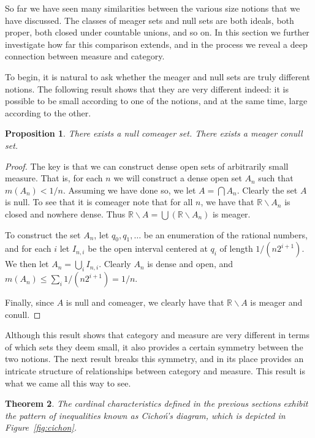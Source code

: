 \documentclass[11pt,oneside,a4paper]{amsbook}
\newcommand{\R}{\mathbb R}
\theoremstyle{definition}
\theoremstyle{plain}
\newtheorem{theorem}{Theorem}[section]
\newtheorem{proposition}[theorem]{Proposition}
\theoremstyle{definition}
\theoremstyle{remark}
\numberwithin{equation}{section}
\numberwithin{figure}{section}
\begin{document}
So far we have seen many similarities between the various size notions that we have discussed. The classes of meager sets and null sets are both ideals, both proper, both closed under countable unions, and so on. In this section we further investigate how far this comparison extends, and in the process we reveal a deep connection between measure and category.

To begin, it is natural to ask whether the meager and null sets are truly different notions. The following result shows that they are very different indeed: it is possible to be small according to one of the notions, and at the same time, large according to the other.

\begin{proposition}
  \label{prop:null-comeager}
  There exists a null comeager set. There exists a meager conull set.  \end{proposition}

\begin{proof}
  The key is that we can construct dense open sets of arbitrarily small measure. That is, for each $n$ we will construct a dense open set $A_n$ such that $m(A_n)<1/n$. Assuming we have done so, we let $A=\bigcap A_n$. Clearly the set $A$ is null. To see that it is comeager note that for all $n$, we have that $\R\smallsetminus A_n$ is closed and nowhere dense. Thus $\R\smallsetminus A=\bigcup(\R\smallsetminus A_n)$ is meager.

  To construct the set $A_n$, let $q_0,q_1,\ldots$ be an enumeration of the rational numbers, and for each $i$ let $I_{n,i}$ be the open interval centered at $q_i$ of length $1/(n2^{i+1})$. We then let $A_n=\bigcup_iI_{n,i}$. Clearly $A_n$ is dense and open, and $m(A_n)\leq\sum_i1/(n2^{i+1})=1/n$.

  Finally, since $A$ is null and comeager, we clearly have that $\R\smallsetminus A$ is meager and conull.
\end{proof}

Although this result shows that category and measure are very different in terms of which sets they deem small, it also provides a certain symmetry between the two notions. The next result breaks this symmetry, and in its place provides an intricate structure of relationships between category and measure. This result is what we came all this way to see.

\begin{theorem}
  \label{thm:cichon}
  The cardinal characteristics defined in the previous sections exhibit the pattern of inequalities known as \emph{Cicho\'n's diagram}, which is depicted in Figure~\ref{fig:cichon}.
\end{theorem}
\end{document}
